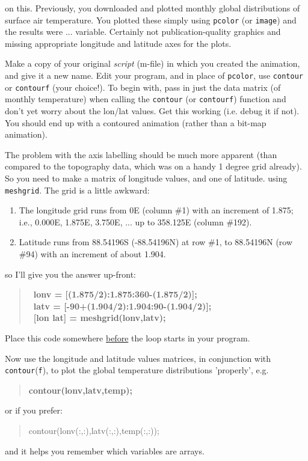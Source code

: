 \documentclass{tufte-book} %
\newenvironment{docspec}{\begin{quotation}\ttfamily\parskip0pt\parindent0pt\ignorespaces}{\end{quotation}}
\newenvironment{docspecbold}{\begin{quotation}\ttfamily\bfseries\parskip0pt\parindent0pt\ignorespaces}{\end{quotation}}
\begin{document}

 on this. Previously, you downloaded and plotted monthly global distributions of surface air temperature. You plotted these simply using \texttt{pcolor} (or \texttt{image}) and the results were ... variable. Certainly not publication-quality graphics and missing appropriate longitude and latitude axes for the plots.

Make a copy of your original \textit{script} (\textsf{m-file}) in which you created the animation, and give it a new name. Edit your program, and in place of \texttt{pcolor}, use \texttt{contour} or \texttt{contourf} (your choice!). To begin with, pass in just the data matrix (of monthly temperature) when calling the \texttt{contour} (or \texttt{contourf}) function and don't yet worry about the lon/lat values. Get this working (i.e. debug it if not). You should end up with a contoured animation (rather than a bit-map animation).

The problem with the axis labelling should be much more apparent (than compared to the topography data, which was on a handy 1 degree grid already). So you need to make a matrix of longitude values, and one of latitude. using \texttt{meshgrid}. The grid is a little awkward:
\begin{enumerate}[noitemsep]
\setlength{\itemindent}{.2in}
\item The longitude grid runs from 0\degree E (column \#1) with an increment of 1.875\degree ; i.e., 0.000\degree E, 1.875\degree E, 3.750\degree E, ... up to 358.125\degree E (column \#192).
\item Latitude runs from 88.54196\degree S (-88.54196\degree N) at row \#1, to 88.54196\degree N (row \#94) with an increment of about 1.904.
\end{enumerate}
so I'll give you the answer up-front:
\begin{docspecbold}
 \ lonv = [(1.875/2):1.875:360-(1.875/2)];
\\ \ latv = [-90+(1.904/2):1.904:90-(1.904/2)];
\\ \ [lon lat] = meshgrid(lonv,latv);
\end{docspecbold}
Place this code somewhere \uline{before} the loop starts in your program.

Now use the longitude and latitude values matrices, in conjunction with \texttt{contour}(\texttt{f}), to plot the global temperature distributions 'properly', e.g.
\begin{docspecbold}
contour(lonv,latv,temp);
\end{docspecbold}
or if you prefer:
\begin{docspec}
contour(lonv(:,:),latv(:,:),temp(:,:));
\end{docspec}
and it helps you remember which variables are arrays.
\end{document}
